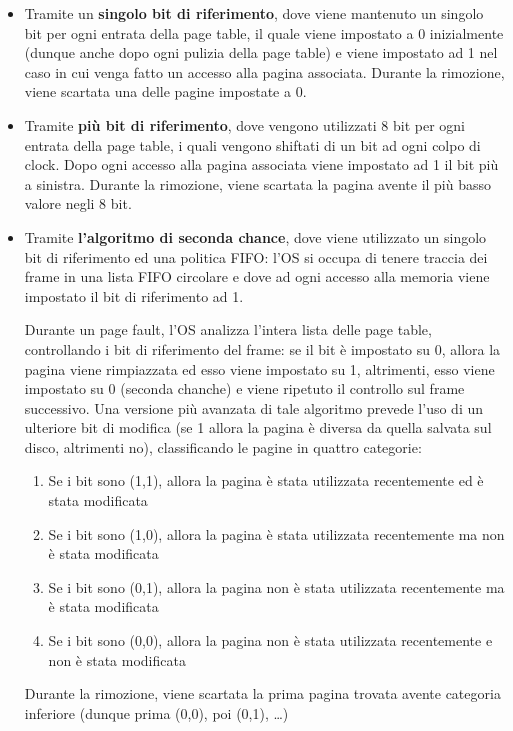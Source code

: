 \documentclass{article}
\begin{document}
\begin{itemize}
    \begin{itemize}
        \item Tramite un \textbf{singolo bit di riferimento}, dove viene mantenuto un singolo bit per ogni entrata della page table, il quale viene impostato a 0 inizialmente (dunque anche dopo ogni pulizia della page table) e viene impostato ad 1 nel caso in cui venga fatto un accesso alla pagina associata.
        Durante la rimozione, viene scartata una delle pagine impostate a 0.
        \item Tramite \textbf{più bit di riferimento}, dove vengono utilizzati 8 bit per ogni entrata della page table, i quali vengono shiftati di un bit ad ogni colpo di clock. Dopo ogni accesso alla pagina associata viene impostato ad 1 il bit più a sinistra.
        Durante la rimozione, viene scartata la pagina avente il più basso valore negli 8 bit.
        \item Tramite \textbf{l'algoritmo di seconda chance}, dove viene utilizzato un singolo bit di riferimento ed una politica FIFO: l'OS si occupa di tenere traccia dei frame in una lista FIFO circolare e dove ad ogni accesso alla memoria viene impostato il bit di riferimento ad 1.\par

        Durante un page fault, l'OS analizza l'intera lista delle page table, controllando i bit di riferimento del frame: se il bit è impostato su 0, allora la pagina viene rimpiazzata ed esso viene impostato su 1, altrimenti, esso viene impostato su 0 (seconda chanche) e viene ripetuto il controllo sul frame successivo.
        Una versione più avanzata di tale algoritmo prevede l'uso di un ulteriore bit di modifica (se 1 allora la pagina è diversa da quella salvata sul disco, altrimenti no), classificando le pagine in quattro categorie:
        \begin{enumerate}
            \item Se i bit sono (1,1), allora la pagina è stata utilizzata recentemente ed è stata modificata
            \item Se i bit sono (1,0), allora la pagina è stata utilizzata recentemente ma non è stata modificata
            \item Se i bit sono (0,1), allora la pagina non è stata utilizzata recentemente ma è stata modificata
            \item Se i bit sono (0,0), allora la pagina non è stata utilizzata recentemente e non è stata modificata
        \end{enumerate}
        Durante la rimozione, viene scartata la prima pagina trovata avente categoria inferiore (dunque prima (0,0), poi (0,1), \dots)
    \end{itemize}
\end{itemize}
\pagebreak
\end{document}
